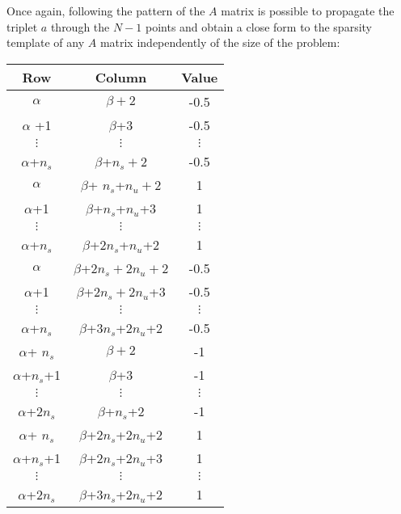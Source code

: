 \documentclass[12pt]{article}
\begin{document}
Once again, following the pattern of the $A$ matrix is possible to propagate the triplet $a$ through the $N-1$ points and obtain a close form to the sparsity template of any $A$ matrix independently of the size of the problem:

\newpage

\begin{table}[h]
\begin{center}
\begin{tabular}{c|c|c}
Row    & Column        & Value \\ \hline
$\alpha$      & $\beta+2$             & -0.5    \\
$\alpha$ +1    & $\beta$+3           & -0.5    \\
$\vdots$ & $\vdots$   &    $\vdots$     \\
$\alpha$+$n_s$ & $\beta$+$n_s+2$        & -0.5    \\
$\alpha$      & $\beta$+ $n_s$+$n_u+2$  & 1     \\
$\alpha$+1    & $\beta$+$n_s$+$n_u$+3 & 1     \\
 $\vdots$ & $\vdots$     &    $\vdots$     \\
$\alpha$+$n_s$ & $\beta$+$2n_s$+$n_u$+2  & 1\\
$\alpha$ & $\beta$+$2n_s+2n_u+2$        & -0.5    \\
$\alpha$+1 & $\beta$+$2n_s+2n_u$+3        & -0.5    \\
 $\vdots$ & $\vdots$     &    $\vdots$     \\
$\alpha$+$n_s$    & $\beta$+$3n_s$+$2n_u$+2 & -0.5     \\
$\alpha$+ $n_s$ & $\beta+2$        & -1    \\
$\alpha$+$n_s$+1 & $\beta$+3        & -1    \\
 $\vdots$ & $\vdots$     &    $\vdots$     \\
$\alpha$+$2n_s$    & $\beta$+$n_s$+2 & -1     \\
$\alpha$+ $n_s$ & $\beta$+$2n_s$+$2n_u$+2        & 1    \\
$\alpha$+$n_s$+1 & $\beta$+$2n_s$+$2n_u$+3        & 1    \\
 $\vdots$ & $\vdots$     &    $\vdots$     \\
$\alpha$+$2n_s$    &$\beta$+$3n_s$+$2n_u$+2 & 1     \\
\end{tabular}
\end{center}
\end{table}
\end{document}
